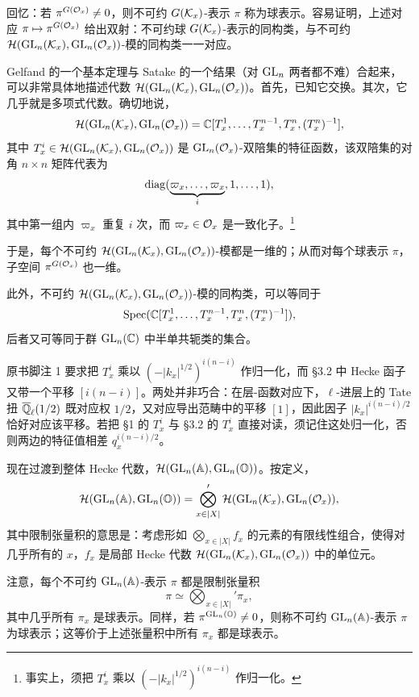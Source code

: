 回忆：若 $\pi^{G(\mathcal{O}_x)}\neq0$，则不可约 $G(\mathcal{K}_x)$-表示 $\pi$ 称为球表示。容易证明，上述对应 $\pi\mapsto\pi^{G(\mathcal{O}_x)}$ 给出双射：不可约球 $G(\mathcal{K}_x)$-表示的同构类，与不可约 $\mathcal{H}(\mathrm{GL}_n(\mathcal{K}_x),\mathrm{GL}_n(\mathcal{O}_x))$-模的同构类一一对应。

Gelfand 的一个基本定理与 Satake 的一个结果（对 $\mathrm{GL}_n$ 两者都不难）合起来，可以非常具体地描述代数 $\mathcal{H}(\mathrm{GL}_n(\mathcal{K}_x),\mathrm{GL}_n(\mathcal{O}_x))$。首先，已知它交换。其次，它几乎就是多项式代数。确切地说，
\[
\mathcal{H}(\mathrm{GL}_n(\mathcal{K}_x),\mathrm{GL}_n(\mathcal{O}_x))=\mathbb{C}[T_x^1,\dots,T_x^{n-1},T_x^n,(T_x^n)^{-1}],
\]
其中 $T_x^i\in\mathcal{H}(\mathrm{GL}_n(\mathcal{K}_x),\mathrm{GL}_n(\mathcal{O}_x))$ 是 $\mathrm{GL}_n(\mathcal{O}_x)$-双陪集的特征函数，该双陪集的对角 $n\times n$ 矩阵代表为
\[
\operatorname{diag}(\underbrace{\varpi_x,\dots,\varpi_x}_{i},1,\dots,1),
\]
其中第一组内 $\varpi_x$ 重复 $i$ 次，而 $\varpi_x\in\mathcal{O}_x$ 是一致化子。\footnote{事实上，须把 $T_x^i$ 乘以 $(-|k_x|^{1/2})^{i(n-i)}$ 作归一化。}

于是，每个不可约 $\mathcal{H}(\mathrm{GL}_n(\mathcal{K}_x),\mathrm{GL}_n(\mathcal{O}_x))$-模都是一维的；从而对每个球表示 $\pi$，子空间 $\pi^{G(\mathcal{O}_x)}$ 也一维。

此外，不可约 $\mathcal{H}(\mathrm{GL}_n(\mathcal{K}_x),\mathrm{GL}_n(\mathcal{O}_x))$-模的同构类，可以等同于
\[
\operatorname{Spec}(\mathbb{C}[T_x^1,\dots,T_x^{n-1},T_x^n,(T_x^n)^{-1}]),
\]
后者又可等同于群 $\mathrm{GL}_n(\mathbb{C})$ 中半单共轭类的集合。

\begin{annote}
原书脚注 1 要求把 $T_x^i$ 乘以 $(-|k_x|^{1/2})^{i(n-i)}$ 作归一化，而 \S3.2 中 Hecke 函子又带一个平移 $[i(n-i)]$。两处并非巧合：在层-函数对应下，$\ell$-进层上的 Tate 扭 $\overline{\mathbb{Q}}_\ell(1/2)$ 既对应权 $1/2$，又对应导出范畴中的平移 $[1]$，因此因子 $|k_x|^{i(n-i)/2}$ 恰好对应该平移。若把 \S1 的 $T_x^i$ 与 \S3.2 的 $T_x^i$ 直接对读，须记住这处归一化，否则两边的特征值相差 $q_x^{i(n-i)/2}$。\par\vspace{0.15em}{\raggedleft 【来源：原书脚注 1 与 \S3.2（A）；层-函数对应中的 Tate 扭约定（B）】\par}
\end{annote}

现在过渡到整体 Hecke 代数，$\mathcal{H}(\mathrm{GL}_n(\mathbb{A}),\mathrm{GL}_n(\mathbb{O}))$。按定义，
\[
\mathcal{H}(\mathrm{GL}_n(\mathbb{A}),\mathrm{GL}_n(\mathbb{O}))=\bigotimes_{x\in|X|}'\mathcal{H}(\mathrm{GL}_n(\mathcal{K}_x),\mathrm{GL}_n(\mathcal{O}_x)),
\]
其中限制张量积的意思是：考虑形如 $\bigotimes_{x\in|X|}f_x$ 的元素的有限线性组合，使得对几乎所有的 $x$，$f_x$ 是局部 Hecke 代数 $\mathcal{H}(\mathrm{GL}_n(\mathcal{K}_x),\mathrm{GL}_n(\mathcal{O}_x))$ 中的单位元。

注意，每个不可约 $\mathrm{GL}_n(\mathbb{A})$-表示 $\pi$ 都是限制张量积
\[
\pi\simeq\bigotimes_{x\in|X|}'\pi_x,
\]
其中几乎所有 $\pi_x$ 是球表示。同样，若 $\pi^{\mathrm{GL}_n(\mathbb{O})}\neq0$，则称不可约 $\mathrm{GL}_n(\mathbb{A})$-表示 $\pi$ 为球表示；这等价于上述张量积中所有 $\pi_x$ 都是球表示。

